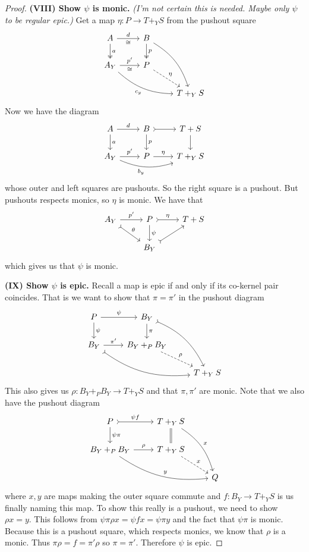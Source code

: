 \documentclass[12pt]{article}
\newcommand{\from}{\colon}
\renewcommand{\(}{\left(}
\renewcommand{\)}{\right)}
\renewcommand{\{}{\left\lbrace}
\renewcommand{\}}{\right\rbrace}
\theoremstyle{remark}
\theoremstyle{definition}
\begin{document}
\begin{proof}
 	\textbf{(VIII) Show $\psi$ is monic.}  \textit{(I'm not certain this is needed. Maybe only $\psi$ to be regular epic.)} Get a map $\eta \from P \to T+_YS$ from the pushout square
 	\[
 	\begin{tikzcd}
	 	{A} 
		 	\ar[r,"d", "\cong"']
		 	\ar[d,twoheadrightarrow,"a"] &
	 	{B} 
		 	\ar[d,twoheadrightarrow,"p"] 
		 	\ar[ddr,bend left=20] &
	 	{}\\
	 	{A_Y} 
		 	\ar[r,"p'","\cong"'] 
		 	\ar[rrd,bend right=20,"c_y"'] &
	 	{P} 
		 	\ar[rd,dashed,"\eta"]\\
	 	{} &
	 	{} &
	 	{T+_YS} 
 	\end{tikzcd}
 	\]
 	Now we have the diagram
 	\[
 	\begin{tikzcd}
	 	{A} \ar[r,"d"] \ar[d,"a"] &
	 	{B} \ar[r,rightarrowtail] \ar[d,"p"] &
	 	{T+S} \ar[d]\\
	 	{A_Y} \ar[r,"p'"] \ar[rr,bend right=20, "b_y"'] &
	 	{P} \ar[r, "\eta"] &
	 	{T+_YS} 
 	\end{tikzcd}
 	\]
 	whose outer and left squares are pushouts. So the right square is a pushout. But pushouts respects monics, so $\eta$ is monic.  We have that
 	\[
	 	\begin{tikzcd}
		 	{A_Y} 
			 	\ar[r,"p'"] 
			 	\ar[rd,rightarrowtail,"\theta"] &
		 	{P} 
			 	\ar[d,"\psi"] 
			 	\ar[r,rightarrowtail,"\eta"]&
		 	{T+S} \\
		 	{} &
		 	{B_Y} \ar[ur,rightarrowtail] &
		 	{} 
	 	\end{tikzcd}
 	\]
 	which gives us that $\psi$ is monic.  
 	
 	\textbf{(IX) Show $\psi$ is epic.} Recall a map is epic if and only if its co-kernel pair coincides.  That is we want to show that $\pi=\pi'$ in the pushout diagram
 	\[
 	\begin{tikzcd}
	 	{P} \ar[r,"\psi"] \ar[d,"\psi"] &
	 	{B_Y} \ar[d,"\pi"] \ar[ddr,bend left=20, rightarrowtail] &
	 	{} \\
	 	{B_Y} \ar[r,"\pi'"] \ar[rrd, bend right=20,rightarrowtail] &
	 	{B_Y +_P B_Y} \ar[rd,dashed,"\rho"] &
	 	{} \\
	 	{} &
	 	{} &
	 	{T+_YS} 
 	\end{tikzcd}
 	\]
 	This also gives us $\rho \from B_Y +_P B_Y \to T+_YS$ and that $\pi,\pi'$ are monic. Note that we also have the pushout diagram
 	\[
 	\begin{tikzcd}
	 	{P} 
		 	\ar[r,rightarrowtail, "\psi f"] 
		 	\ar[d, "\psi \pi"] &
	 	{T+_YS} 
		 	\ar[d,equal] 
		 	\ar[ddr,bend left=20, "x"] &
	 	{} \\
	 	{B_Y +_P B_Y} 
		 	\ar[r,"\rho"] 
		 	\ar[rrd, bend right=20,"y"] &
	 	{T+_YS} 
		 	\ar[rd,dashed,"x"] &
	 	{} \\
	 	{} &
	 	{} &
	 	{Q} 
 	\end{tikzcd}
 	\]
 	where $x,y$ are maps making the outer square commute and $f \from B_Y \to T+_YS$ is us finally naming this map. To show this really is a pushout, we need to show $\rho x = y$. This follows from $\psi \pi \rho x =\psi f x = \psi \pi y$ and the fact that $\psi \pi$ is monic.  Because this is a pushout square, which respects monics, we know that $\rho$ is a monic.  Thus $\pi \rho = f = \pi' \rho$ so $\pi = \pi'$.  Therefore $\psi$ is epic.  
 	

\end{proof}
\end{document}
